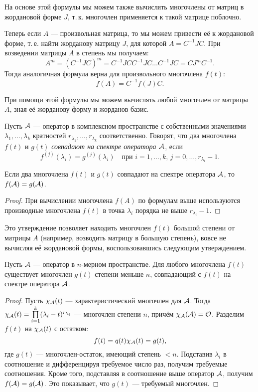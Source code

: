 На основе этой формулы мы можем также вычислять многочлены от матриц в жордановой форме $J$, т.\,к. многочлен применяется к такой матрице поблочно.

Теперь если $A$ --- произвольная матрица, то мы можем привести её к жордановой форме, т.\,е. найти жорданову матрицу $J$, для которой $A = C^{-1}JC$. При возведении матрицы $A$ в степень мы получаем:
\[
    A^m = (C^{-1}JC)^m = C^{-1}JCC^{-1}JC\ldots C^{-1}JC = CJ^mC^{-1}.
\]
Тогда аналогичная формула верна для произвольного многочлена $f(t)$:
\[
    f(A) = C^{-1}f(J)C.
\]

При помощи этой формулы мы можем вычислять любой многочлен от матрицы $A$, зная её жорданову форму и жорданов базис.

\begin{definition}
    Пусть $\mathcal{A}$ --- оператор в комплексном пространстве с собственными значениями $\lambda_1, \ldots, \lambda_k$ кратностей $r_{\lambda_1}, \ldots, r_{\lambda_k}$ соответственно. Говорят, что два многочлена $f(t)$ и $g(t)$ \textit{совпадают на спектре оператора $\mathcal{A}$}, если
    \[
        f^{(j)}(\lambda_i) = g^{(j)}(\lambda_i)\quad\text{при $i = 1, \ldots, k$, $j = 0, \ldots, r_{\lambda_i} - 1$.}
    \]
\end{definition}

\begin{proposal}
    Если два многочлена $f(t)$ и $g(t)$ совпадают на спектре оператора $\mathcal{A}$, то $f(\mathcal{A}) = g(\mathcal{A})$.
\end{proposal}

\begin{proof}
    При вычислении многочлена $f(A)$ по формулам выше используются производные многочлена $f(t)$ в точка $\lambda_i$ порядка не выше $r_{\lambda_i} - 1$.
\end{proof}

Это утверждение позволяет находить многочлен $f(t)$ большой степени от матрицы $A$ (например, возводить матрицу в большую степень), вовсе не вычисляя её жордановой формы, воспользовавшись следующим утверждением.

\begin{proposal}
    Пусть $\mathcal{A}$ --- оператор в $n$-мерном пространстве. Для любого многочлена $f(t)$ существует многочлен $g(t)$ степени меньше $n$, совпадающий с $f(t)$ на спектре оператора $\mathcal{A}$.
\end{proposal}

\begin{proof}
    Пусть $\chi_{\mathcal{A}}(t)$ --- характеристический многочлен для $\mathcal{A}$. Тогда $\chi_{\mathcal{A}}(t) = \prod\limits_{i = 1}^k(\lambda_i - t)^{r_{\lambda_i}}$ --- многочлен степени $n$, причём $\chi_{\mathcal{A}}(\mathcal{A}) = \mathcal{O}$. Разделим $f(t)$ на $\chi_{\mathcal{A}}(t)$ с остатком:
    \[
        f(t) = q(t)\chi_{\mathcal{A}}(t) = g(t),
    \]
    где $g(t)$ --- многочлен-остаток, имеющий степень $< n$. Подставив $\lambda_i$ в соотношение и дифференцируя требуемое число раз, получим требуемые соотношения. Кроме того, подставляя в соотношение выше оператор $\mathcal{A}$, получим $f(\mathcal{A}) = g(\mathcal{A})$. Это показывает, что $g(t)$ --- требуемый многочлен.
\end{proof}

